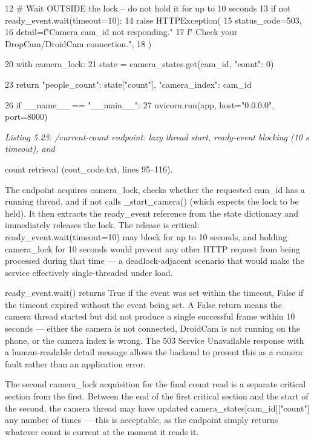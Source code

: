 12 \# Wait OUTSIDE the lock -- do not hold it for up to 10 seconds
13 if not ready\_event.wait(timeout=10):
14 raise HTTPException(
15 status\_code=503,
16 detail=f"Camera {cam\_id} not responding."
17 f" Check your DropCam/DroidCam connection.",
18 )

20 with camera\_lock:
21 state = camera\_states.get(cam\_id, {"count": 0})






23 return {"people\_count": state["count"], "camera\_index": cam\_id}



26 if \_\_name\_\_ == "\_\_main\_\_":
27 uvicorn.run(app, host="0.0.0.0", port=8000)


\textit{Listing 5.23: /current-count endpoint: lazy thread start, ready-event blocking (10 s timeout), and}

count retrieval (cout\_code.txt, lines 95--116).


The endpoint acquires camera\_lock, checks whether the requested cam\_id has a
running thread, and if not calls \_start\_camera() (which expects the lock to be held). It
then extracts the ready\_event reference from the state dictionary and immediately releases
the lock. The release is critical: ready\_event.wait(timeout=10) may block for up
to 10 seconds, and holding camera\_lock for 10 seconds would prevent any other HTTP
request from being processed during that time --- a deadlock-adjacent scenario that would
make the service effectively single-threaded under load.

ready\_event.wait() returns True if the event was set within the timeout, False if
the timeout expired without the event being set. A False return means the camera thread
started but did not produce a single successful frame within 10 seconds --- either the camera
is not connected, DroidCam is not running on the phone, or the camera index is wrong.
The 503 Service Unavailable response with a human-readable detail message allows the
backend to present this as a camera fault rather than an application error.

The second camera\_lock acquisition for the ﬁnal count read is a separate critical
section from the ﬁrst. Between the end of the ﬁrst critical section and the start of the second,
the camera thread may have updated camera\_states[cam\_id]["count"] any number of
times --- this is acceptable, as the endpoint simply returns whatever count is current at the
moment it reads it.



